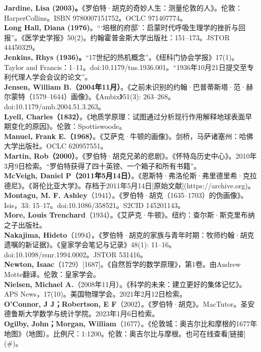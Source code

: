 \textbf{Jardine, Lisa (2003)。}《罗伯特·胡克的奇妙人生：测量伦敦的人》。伦敦：HarperCollins。ISBN 9780007151752。OCLC 971407774。\\
\textbf{Long Hall, Diana (1976)}。“‘培根的府邸’：启蒙时代呼吸生理学的挫折与回报”。《医学史学报》50(2)。约翰霍普金斯大学出版社：151–173。JSTOR 44450329。\\
\textbf{Jenkins, Rhys (1936)。}“17世纪的热机概念”。《纽科门协会学报》17(1)。Taylor and Francis：1–11。doi:10.1179/tns.1936.001。“1936年10月21日提交至专利代理人学会会议的论文”。\\
\textbf{Jensen, William B.（2004年11月）}。《之前未识别的约翰·巴普蒂斯塔·范·赫尔蒙特（1579–1644）画像》。《Ambix》51(3): 263–268。doi:10.1179/amb.2004.51.3.263。\\
\textbf{Lyell, Charles（1832）}。《地质学原理：试图通过分析现行作用解释地球表面早期变化的原因》。伦敦：Spottiswoode。\\
\textbf{Manuel, Frank E.（1968）}。《艾萨克·牛顿的画像》。剑桥，马萨诸塞州：哈佛大学出版社。OCLC 620957551。\\
\textbf{Martin, Rob（2000）}。《罗伯特·胡克兄弟的悲剧》。《怀特岛历史中心》。2010年3月9日检索。“罗伯特获得了四十英镑、一个箱子和所有书籍”。\\
\textbf{McVeigh, Daniel P（2011年5月14日）}。《恩斯特·弗洛伦斯·弗里德里希·克拉德尼》。《哥伦比亚大学》。存档于2011年5月14日[原始文献](https://archive.org)。\\
\textbf{Montagu, M. F. Ashley}（1941）。《罗伯特·胡克（1635–1703）的伪画像》。Isis，33: 15–17。doi:10.1086/358521。S2CID 145201143。\\
\textbf{More, Louis Trenchard}（1934）。《艾萨克·牛顿》。纽约：查尔斯·斯克里布纳之子出版社。\\
\textbf{Nakajima, Hideto}（1994）。《罗伯特·胡克的家族与青年时期：牧师约翰·胡克遗嘱的新证据》。《皇家学会笔记与记录》48(1): 11–16。doi:10.1098/rsnr.1994.0002。JSTOR 531416。\\
\textbf{Newton, Isaac}（1729）[1687]。《自然哲学的数学原理》，第1卷。由Andrew Motte翻译。伦敦：皇家学会。\\
\textbf{Nielsen, Michael A.}（2008年11月）。《科学的未来：建立更好的集体记忆》。APS News，17(10)。美国物理学会。2021年2月12日检索。\\
\textbf{O'Connor, J J；Robertson, E F}（2002）。《罗伯特·胡克》。MacTutor。圣安德鲁斯大学数学与统计学院。2023年1月6日检索。\\
\textbf{Ogilby, John；Morgan, William}（1677）。《伦敦城：奥吉尔比和摩根的1677年地图》（地图）。比例尺：1:1200。伦敦：奥吉尔比与摩根。也可在线查看[链接](#)。\\

